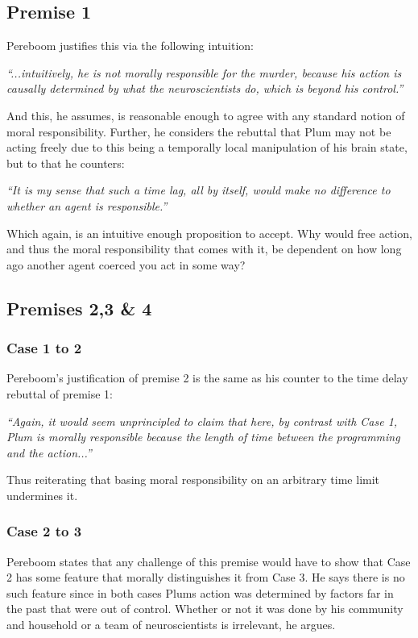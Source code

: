 \documentclass{article}
\begin{document}
\subsection{Premise 1}
Pereboom justifies this via the following intuition:
\begin{displayquote}
  \textit{``...intuitively, he is not morally responsible for the murder, because his action is causally determined by what the neuroscientists do, which is beyond his control.''}
\end{displayquote}

And this, he assumes, is reasonable enough to agree with any standard notion of moral responsibility. Further, he considers the rebuttal that Plum may not be acting freely due to this being a temporally local manipulation of his brain state, but to that he counters:
\begin{displayquote}
  \textit{``It is my sense that such a time lag, all by itself, would make no difference to whether an agent is responsible.''}
\end{displayquote}

Which again, is an intuitive enough proposition to accept. Why would free action, and thus the moral responsibility that comes with it, be dependent on how long ago another agent coerced you act in some way?

\subsection{Premises 2,3 \& 4}
\subsubsection{Case 1 to 2}
Pereboom's justification of premise 2 is the same as his counter to the time delay rebuttal of premise 1:
\begin{displayquote}
  \textit{``Again, it would seem unprincipled to claim that here, by contrast with Case 1, Plum is morally responsible because the length of time between the programming and the action...''}
\end{displayquote}

Thus reiterating that basing moral responsibility on an arbitrary time limit undermines it.

\subsubsection{Case 2 to 3}
Pereboom states that any challenge of this premise would have to show that Case 2 has some feature that morally distinguishes it from Case 3. He says there is no such feature since in both cases Plums action was determined by factors far in the past that were out of control. Whether or not it was done by his community and household or a team of neuroscientists is irrelevant, he argues.
\end{document}
